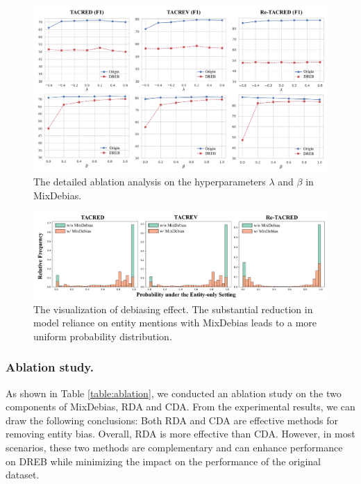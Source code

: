 \documentclass[letterpaper]{article} %
\begin{document}
\begin{figure}[ht]
    \centering
    \includegraphics[width=\linewidth]{figure/parameter.pdf}
    \caption{The detailed ablation analysis on the hyperparameters \( \lambda \) and \( \beta \) in MixDebias.}
    \label{fig:parameter}
\end{figure}

\begin{figure}[!]
    \centering
    \includegraphics[width=\linewidth]{figure/generalization.pdf}
    \caption{The visualization of debiasing effect. The substantial reduction in model reliance on entity mentions with MixDebias leads to a more uniform probability distribution.}
    \label{fig:generalization}
\end{figure}

\subsubsection{Ablation study.}

As shown in Table \ref{table:ablation}, we conducted an ablation study on the two components of MixDebias, RDA and CDA. From the experimental results, we can draw the following conclusions: Both RDA and CDA are effective methods for removing entity bias. Overall, RDA is more effective than CDA. However, in most scenarios, these two methods are complementary and can enhance performance on DREB while minimizing the impact on the performance of the original dataset.
\end{document}
